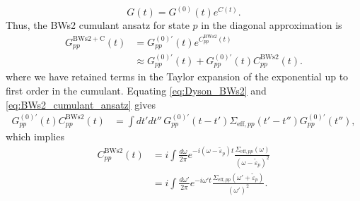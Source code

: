 \[
G(t) = G^{(0)}(t) e^{C(t)}.
\]
Thus, the BWs2 cumulant ansatz for state $p$ in the diagonal approximation is
\begin{align}
G_{pp}^{\mathrm{BWs2+C}}(t)
&=
G_{pp}^{(0)'}(t)
e^{C_{pp}^{\mathrm{BWs2}}(t)} \\
&\approx
G_{pp}^{(0)'}(t)
+
G_{pp}^{(0)'}(t)
C_{pp}^{\mathrm{BWs2}}(t).
\label{eq:BWs2_cumulant_ansatz}
\end{align}
where we have retained terms in the Taylor expansion of the exponential up to first order in the cumulant.
Equating \eqref{eq:Dyson_BWs2} and
\eqref{eq:BWs2_cumulant_ansatz} gives
\begin{align}
G_{pp}^{(0)'}(t)
C_{pp}^{\mathrm{BWs2}}(t)
&=
\int dt' dt'' \,
G_{pp}^{(0)'}(t - t')
\Sigma_{\mathrm{eff},pp}(t' - t'')
G_{pp}^{(0)'}(t''),
\end{align}
which implies
\begin{align}
C_{pp}^{\mathrm{BWs2}}(t)
&=
i \int \frac{d\omega}{2\pi}
e^{-i(\omega - \tilde{\varepsilon}_p)t}
\frac{\Sigma_{\mathrm{eff},pp}(\omega)}
     {(\omega - \tilde{\varepsilon}_p)^2} \\
&=
i \int \frac{d\omega'}{2\pi}
e^{-i\omega' t}
\frac{\Sigma_{\mathrm{eff},pp}(\omega' + \tilde{\varepsilon}_p)}
     {(\omega')^2}. %
\end{align}
